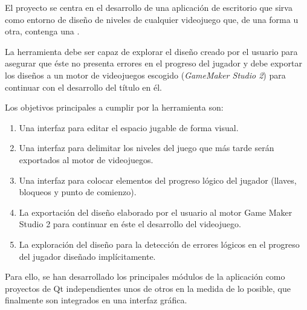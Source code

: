 El proyecto se centra en el desarrollo de una aplicación de escritorio que sirva como entorno de diseño de niveles de cualquier videojuego que, de una forma u otra, contenga una .

La herramienta debe ser capaz de explorar el diseño creado por el usuario para asegurar que éste no presenta errores en el progreso del jugador y debe exportar los diseños a un motor de videojuegos escogido (\textit{GameMaker Studio 2}) para continuar con el desarrollo del título en él.

Los objetivos principales a cumplir por la herramienta son:
\begin{enumerate}
	\item Una interfaz para editar el espacio jugable de forma visual.
	\item Una interfaz para delimitar los niveles del juego que más tarde serán exportados al motor de videojuegos.
	\item Una interfaz para colocar elementos del progreso lógico del jugador (llaves, bloqueos y punto de comienzo).
	\item La exportación del diseño elaborado por el usuario al motor Game Maker Studio 2 para continuar en éste el desarrollo del videojuego.
	\item La exploración del diseño para la detección de errores lógicos en el progreso del jugador diseñado implícitamente.
\end{enumerate}

Para ello, se han desarrollado los principales módulos de la aplicación como proyectos de Qt independientes unos de otros en la medida de lo posible, que finalmente son integrados en una interfaz gráfica.
